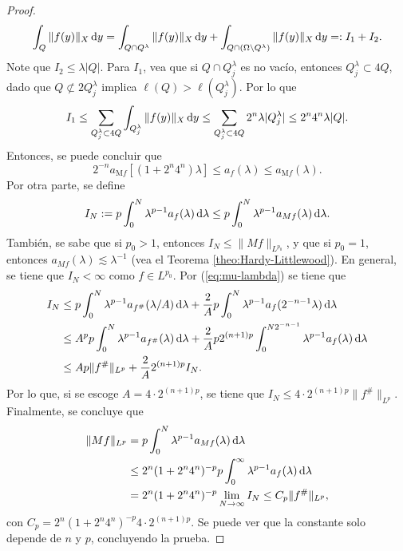 \begin{proof}
	\begin{equation*}
		\int_Q\|f(y)\|_X\mathop{}\!\mathrm{d} y = \int_{Q\cap Q^\lambda} \|f(y)\|_X\mathop{}\!\mathrm{d} y + \int_{Q\cap (\Omega\setminus Q^\lambda)} \|f(y)\|_X\mathop{}\!\mathrm{d} y =: I_1 + I_2.
	\end{equation*}
	Note que $I_2 \leq \lambda |Q|$. Para $I_1$, vea que si $Q\cap Q_j^\lambda$ es no vacío, entonces $Q_j^\lambda \subset 4Q$, dado que $Q \not\subset 2Q_j^\lambda$ implica $\ell(Q) > \ell(Q_j^\lambda)$. Por lo que 
	\begin{equation*}
		I_1 \leq \sum_{Q_j^\lambda\subset4Q} \int_{Q_j^\lambda} \|f(y)\|_X\mathop{}\!\mathrm{d} y \leq \sum_{Q_j^\lambda\subset4Q} 2^n\lambda |Q_j^\lambda| \leq 2^n4^n\lambda|Q|.
	\end{equation*}
	Entonces, se puede concluir que 
	\begin{equation}\label{eq:mu-density}
		2^{-n}a_{\mathrm{M}f}[(1+2^n4^n)\lambda] \leq a_{f}(\lambda) \leq a_{\mathrm{M}f}(\lambda).
	\end{equation}
	Por otra parte, se define 
	\begin{equation*}
		I_N := p\int_0^N\lambda^{p-1}a_{f}(\lambda)\mathop{}\!\mathrm{d} \lambda \leq p\int_0^N\lambda^{p-1}a_{Mf}(\lambda)\mathop{}\!\mathrm{d} \lambda.
	\end{equation*}
	También, se sabe que si $p_0>1$, entonces $I_N\leq \|Mf\|_{L^{p_0}}$, y que si $p_0=1$, entonces $a_{Mf}(\lambda)\lesssim \lambda^{-1}$ (vea el Teorema \ref{theo:Hardy-Littlewood}). En general, se tiene que $I_N<\infty$ como $f\in L^{p_0}$. Por (\ref{eq:mu-lambda}) se tiene que 
	\begin{align*}
		I_N & \leq p\int_0^N\lambda^{p-1}a_{f^\#}(\lambda/A)\mathop{}\!\mathrm{d}\lambda + \frac{2}{A}p\int_0^N\lambda^{p-1}a_{f}(2^{-n-1}\lambda)\mathop{}\!\mathrm{d} \lambda \\
		& \leq A^p p\int_0^N\lambda^{p-1}a_{f^\#}(\lambda)\mathop{}\!\mathrm{d}\lambda +\frac{2}{A} p2^{(n+1)p} \int_0^{N2^{-n-1}}\lambda^{p-1} a_{f}(\lambda)\mathop{}\!\mathrm{d}\lambda \\
		& \leq Ap\|f^\#\|_{L^p} + \frac{2}{A}2^{(n+1)p} I_N.
	\end{align*}
	Por lo que, si se escoge $A=4\cdot2^{(n+1)p}$, se tiene que $I_N \leq 4\cdot 2^{(n+1)p}\|f^\#\|_{L^p}$. Finalmente, se concluye que 
	\begin{align*}
		\|Mf\|_{L^p} & = p\int_0^N\lambda^{p-1}a_{Mf}(\lambda)\mathop{}\!\mathrm{d} \lambda \\
		& \leq 2^n(1+2^n4^n)^{-p} p\int_0^\infty\lambda^{p-1}a_{f}(\lambda)\mathop{}\!\mathrm{d} \lambda \\
		& =2^n(1+2^n4^n)^{-p}  \lim_{N\to\infty} I_N \leq C_p\|f^\#\|_{L^p},
	\end{align*}
	con $C_p = 2^n(1+2^n4^n)^{-p} 4\cdot 2^{(n+1)p}$. Se puede ver que la constante solo depende de $n$ y $p$, concluyendo la prueba.
\end{proof}

